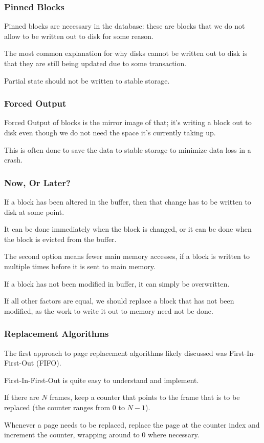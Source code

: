 \begin{frame}
\frametitle{Pinned Blocks}

\alert{Pinned blocks} are necessary in the database: these are blocks that we do not allow to be written out to disk for some reason. 

The most common explanation for why disks cannot be written out to disk is that they are still being updated due to some transaction. 

Partial state should not be written to stable storage. 

\end{frame}

\begin{frame}
\frametitle{Forced Output}

\alert{Forced Output} of blocks is the mirror image of that; it's writing a block out to disk even though we do not need the space it's currently taking up. 

This is often done to save the data to stable storage to minimize data loss in a crash.

\end{frame}


\begin{frame}
\frametitle{Now, Or Later?}

If a block has been altered in the buffer, then that change has to be written to disk at some point. 

It can be done immediately when the block is changed, or it can be done when the block is evicted from the buffer. 

The second option means fewer main memory accesses, if a block is written to multiple times before it is sent to main memory. 

If a block has not been modified in buffer, it can simply be overwritten. 

If all other factors are equal, we should replace a block that has not been modified, as the work to write it out to memory need not be done.


\end{frame}

\begin{frame}
\frametitle{Replacement Algorithms}

The first approach to page replacement algorithms likely discussed was First-In-First-Out (FIFO). 

First-In-First-Out is quite easy to understand and implement. 

If there are $N$ frames, keep a counter that points to the frame that is to be replaced (the counter ranges from $0$ to $N-1$). 

Whenever a page needs to be replaced, replace the page at the counter index and increment the counter, wrapping around to 0 where necessary.

\end{frame}

